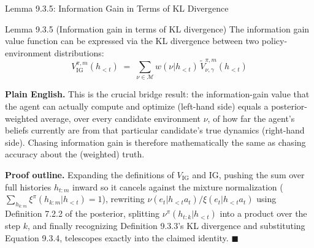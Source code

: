 \documentclass[aspectratio=169,10pt]{beamer}
\newcommand{\IG}{\mathrm{IG}}
\begin{document}
\begin{frame}{Lemma 9.3.5: Information Gain in Terms of KL Divergence}
  \begin{block}{Lemma 9.3.5 (Information gain in terms of KL divergence)}
    The information gain value function can be expressed via the KL
    divergence between two policy-environment distributions:
    \[
      V^{\pi,m}_{\IG}(h_{<t}) \;=\; \sum_{\nu\in\mathcal{M}} w(\nu|h_{<t})\,\tilde V^{\pi,m}_{\nu,\gamma}(h_{<t})
    \]
  \end{block}
  \textbf{Plain English.} This is the crucial bridge result: the
  information-gain value that the agent can actually compute and optimize
  (left-hand side) equals a posterior-weighted average, over every
  candidate environment $\nu$, of how far the agent's beliefs currently are
  from that particular candidate's true dynamics (right-hand side). Chasing
  information gain is therefore mathematically the same as chasing
  accuracy about the (weighted) truth.

  \vspace{0.4em}
  \textbf{Proof outline.} Expanding the definitions of $V_{\IG}$ and $\IG$,
  pushing the sum over full histories $h_{t:m}$ inward so it cancels against
  the mixture normalization ($\sum_{h_{k:m}}\xi^\pi(h_{k:m}|h_{<t})=1$),
  rewriting $\nu(e_t|h_{<t}a_t)/\xi(e_t|h_{<t}a_t)$ using Definition 7.2.2 of
  the posterior, splitting $\nu^\pi(h_{t:k}|h_{<t})$ into a product over the
  step $k$, and finally recognizing Definition 9.3.3's KL divergence and
  substituting Equation 9.3.4, telescopes exactly into the claimed identity.
  $\blacksquare$
\end{frame}
\end{document}

